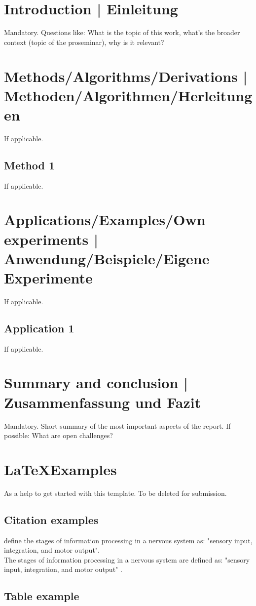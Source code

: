 \section{Introduction | Einleitung}
Mandatory. Questions like: What is the topic of this work, what's the broader context (topic of the proseminar), why is it relevant?


\section{Methods/Algorithms/Derivations | Methoden/Algorithmen/Herleitungen}
If applicable.
\subsection{Method 1}
If applicable.


\section{Applications/Examples/Own experiments | Anwendung/Beispiele/Eigene Experimente}
If applicable.
\subsection{Application 1}
If applicable.


\section{Summary and conclusion | Zusammenfassung und Fazit}
Mandatory. Short summary of the most important aspects of the report.
If possible: What are open challenges?

\newpage
\section{\LaTeX Examples}
As a help to get started with this template. To be deleted for submission.
\subsection{Citation examples}
\citet{campbell:2017} define the stages of information processing in a nervous system as: "sensory input, integration, and motor output". \\
The stages of information processing in a nervous system are defined as: "sensory input, integration, and motor output" \citep{campbell:2017}. 

\subsection{Table example}


